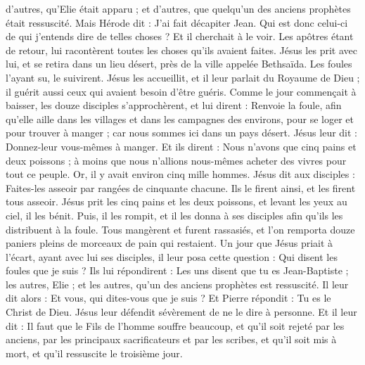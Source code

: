 \begin{multicols}{2}
d'autres, qu'Elie était apparu ; et d'autres, que quelqu'un des anciens prophètes était ressuscité.
Mais Hérode dit : J'ai fait décapiter Jean. Qui est donc celui-ci de qui j'entends dire de telles choses ? Et il cherchait à le voir.
Les apôtres étant de retour, lui racontèrent toutes les choses qu'ils avaient faites. Jésus les prit avec lui, et se retira dans un lieu désert, près de la ville appelée Bethsaïda.
Les foules l'ayant su, le suivirent. Jésus les accueillit, et il leur parlait du Royaume de Dieu ; il guérit aussi ceux qui avaient besoin d'être guéris.
Comme le jour commençait à baisser, les douze disciples s'approchèrent, et lui dirent : Renvoie la foule, afin qu'elle aille dans les villages et dans les campagnes des environs, pour se loger et pour trouver à manger ; car nous sommes ici dans un pays désert.
Jésus leur dit : Donnez-leur vous-mêmes à manger. Et ils dirent : Nous n'avons que cinq pains et deux poissons ; à moins que nous n'allions nous-mêmes acheter des vivres pour tout ce peuple.
Or, il y avait environ cinq mille hommes. Jésus dit aux disciples : Faites-les asseoir par rangées de cinquante chacune.
Ils le firent ainsi, et les firent tous asseoir.
Jésus prit les cinq pains et les deux poissons, et levant les yeux au ciel, il les bénit. Puis, il les rompit, et il les donna à ses disciples afin qu'ils les distribuent à la foule.
Tous mangèrent et furent rassasiés, et l'on remporta douze paniers pleins de morceaux de pain qui restaient.
Un jour que Jésus priait à l'écart, ayant avec lui ses disciples, il leur posa cette question : Qui disent les foules que je suis ?
Ils lui répondirent : Les uns disent que tu es Jean-Baptiste ; les autres, Elie ; et les autres, qu'un des anciens prophètes est ressuscité.
Il leur dit alors : Et vous, qui dites-vous que je suis ? Et Pierre répondit : Tu es le Christ de Dieu.
Jésus leur défendit sévèrement de ne le dire à personne.
Et il leur dit : Il faut que le Fils de l'homme souffre beaucoup, et qu'il soit rejeté par les anciens, par les principaux sacrificateurs et par les scribes, et qu'il soit mis à mort, et qu'il ressuscite le troisième jour.

\end{multicols}
